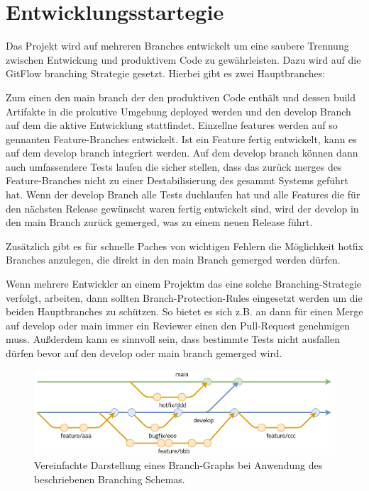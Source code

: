 \chapter{Entwicklungsstartegie}
\label{chap:git-strat}

Das Projekt wird auf mehreren Branches entwickelt um eine saubere Trennung zwischen Entwickung und produktivem Code zu gewährleisten. Dazu wird auf die GitFlow branching Strategie gesetzt. Hierbei gibt es zwei Hauptbranches: 

Zum einen den main branch der den produktiven Code enthält und dessen build Artifakte in die prokutive Umgebung deployed werden und den develop Branch auf dem die aktive Entwicklung stattfindet. Einzellne features werden auf so gennanten Feature-Branches entwickelt. Ist ein Feature fertig entwickelt, kann es auf dem develop branch integriert werden. Auf dem develop branch können dann auch umfassendere Tests laufen die sicher stellen, dass das zurück merges des Feature-Branches nicht zu einer Destabilisierung des gesammt Systems geführt hat. Wenn der develop Branch alle Tests duchlaufen hat und alle Features die für den nächsten Release gewünscht waren fertig entwickelt sind, wird der develop in den main Branch zurück gemerged, was zu einem neuen Release führt.

Zusätzlich gibt es für schnelle Paches von wichtigen Fehlern die Möglichkeit hotfix Branches anzulegen, die direkt in den main Branch gemerged werden dürfen.

Wenn mehrere Entwickler an einem Projektm das eine solche Branching-Strategie verfolgt, arbeiten, dann sollten Branch-Protection-Rules eingesetzt werden um die beiden Hauptbranches zu schützen. So bietet es sich z.B. an dann für einen Merge auf develop oder main immer ein Reviewer einen den Pull-Request genehmigen muss. Außderdem kann es sinnvoll sein, dass bestimmte Tests nicht ausfallen dürfen bevor auf den develop oder main branch gemerged wird.

\begin{figure}
    \includegraphics[scale=0.25]{res/branching_scheme.drawio.png}
    \caption{Vereinfachte Darstellung eines Branch-Graphs bei Anwendung des beschriebenen Branching Schemas.}
\end{figure}